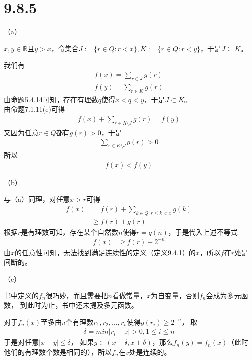 \documentclass{article}
\begin{document}
\section*{9.8.5}
（a）

$x, y \in \mathbb{R}$且$y > x$，令集合$J := \{r \in Q: r < x\}, K := \{r \in Q: r < y\}$，于是$J \subseteq K$。

我们有
\begin{align*}
      f(x) = \sum\limits_{r \in J} g(r) \\
      f(y) = \sum\limits_{r \in K} g(r)
\end{align*}
由命题5.4.14可知，存在有理数$q$使得$x < q < y$，于是$J \subset K$。\\
由命题7.1.11(e)可得
\begin{align*}
      f(x) + \sum\limits_{r \in K \setminus J} g(r) = f(y)
\end{align*}
又因为任意$r \in Q$都有$g(r) > 0$，于是
\begin{align*}
      \sum\limits_{r \in K \setminus J} g(r) > 0
\end{align*}
所以
\begin{align*}
      f(x) < f(y)
\end{align*}

（b）

与（a）同理，对任意$x > r$可得
\begin{align*}
      f(x) & = f(r) + \sum\limits_{k \in Q: r \leq k < x} g(k) \\
           & \geq f(r) + g(r)
\end{align*}
根据$r$是有理数可知，存在某个自然数$n$使得$r = q(n)$，于是代入上述不等式
\begin{align*}
      f(x) & \geq f(r) + 2^{-n}
\end{align*}
由$x$的任意性可知，无法找到满足连续性的定义（定义9.4.1）的$x$，所以$f$在$r$处是间断的。

（c）

\begin{zremark}
      书中定义的$f_n$很巧妙，而且需要把$n$看做常量，$x$为自变量，否则$f_n$会成为多元函数，
      到此时为止，书中还未提及多元函数。
\end{zremark}

对于$f_n(x)$至多由$n$个有理数$r_1,r_2,\dots,r_n$使得$g(r_i) \geq 2^{-n}$，
取
\begin{align*}
      \delta = min|r_i - x|>0, 1 \leq i \leq n
\end{align*}
于是对任意$|x - y| \leq \delta$，
如果$y \in (x-\delta, x+\delta)$，那么$f_n(y) = f_n(x)$（此时他们的有理数个数是相同的），所以$f_n$在$x$处是连续的。
\end{document}
